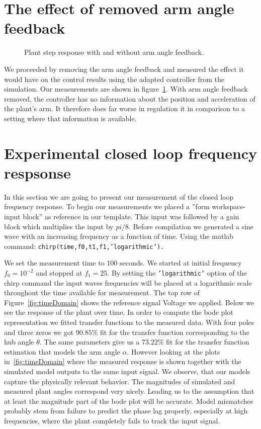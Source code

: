\documentclass[ twoside,openright,titlepage,numbers=noenddot,headinclude,%
                footinclude=true,cleardoublepage=empty,abstractoff, %
                BCOR=5mm,paper=a4,fontsize=11pt,%
                ngerman,american,%
                ]{scrreprt}
\begin{document}
{\section{The effect of removed arm angle feedback}
\begin{figure}

\caption{Plant step response with and without arm angle feedback.}
\label{fig:alphaNoAlpha}
\end{figure}
We proceeded by removing the arm angle feedback and measured the effect it would have on the control results using the adapted controller from the simulation. Our measurements are shown in figure~\ref{fig:alphaNoAlpha}. With arm angle feedback removed, the controller has no information about the position and acceleration of the plant's arm. It therefore does far worse in regulation it in comparison to a setting where that information is available. 

\section{Experimental closed loop frequency respsonse}
In this section we are going to present our measurement of the closed loop frequency response. To begin our measurements we placed a ''form workspace-input block'' as reference in our template.  This input was followed by a gain block which multiplies the input by $pi/8$. Before compilation we generated a sine wave with an increasing frequency as a function of time. Using the matlab command: \texttt{chirp(time,f0,t1,f1}\texttt{,'logarithmic').}} We set the measurement time to 100 seconds. We started at initial frequency $f_0 = 10^{-2}$ and stopped at $f_1 = 25$. By setting the \texttt{'logarithmic'} option of the chirp command the input waves frequencies will be placed at a logarithmic scale throughout the time available for measurement. The top row of Figure~\ref{fig:timeDomain} shows the reference signal Voltage we applied. Below we see the response of the plant over time. In order to compute the bode plot representation we fitted transfer functions to the measured data. With four poles and three zeros we got $90.85\%$ fit for the transfer function corresponding to the hub angle $\theta$. The same parameters give us a $73.22\%$ fit for the transfer function estimation that models the arm angle $\alpha$. However looking at the plots in~\ref{fig:timeDomain} where the measured response is shown together with the simulated model outputs to the same input signal. We observe, that our models capture the physically relevant behavior. The magnitudes of simulated and measured plant angles correspond very nicely. Leading us to the assumption that at least the magnitude part of the bode plot will be accurate. Model mismatches probably stem from failure to predict the phase lag properly, especially at high frequencies, where the plant completely fails to track the input signal.
 
\end{document}
